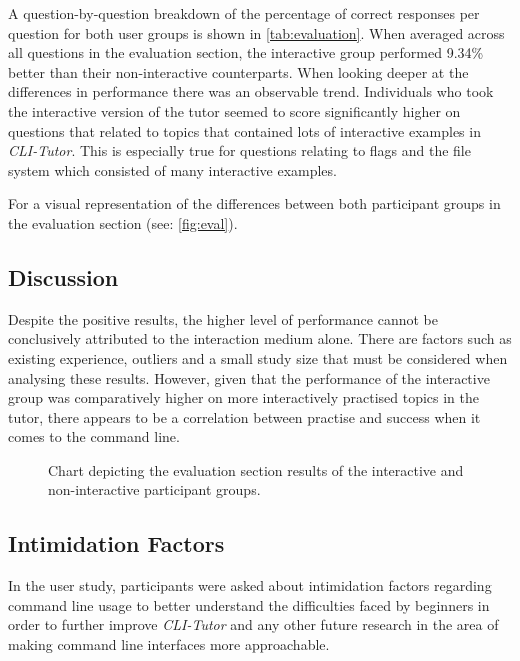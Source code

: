 A question-by-question breakdown of the percentage of correct responses per
question for both user groups is shown in \autoref{tab:evaluation}. When
averaged across all questions in the evaluation section, the interactive group
performed 9.34\% better than their non-interactive counterparts. When looking
deeper at the differences in performance there was an observable trend.
Individuals who took the interactive version of the tutor seemed to score
significantly higher on questions that related to topics that contained lots of
interactive examples in \textit{CLI-Tutor}. This is especially true for
questions relating to flags and the file system which consisted of many
interactive examples.

For a visual representation of the differences between both participant groups
in the evaluation section (see: \autoref{fig:eval}).

\subsection{Discussion}

Despite the positive results, the higher level of performance cannot be
conclusively attributed to the interaction medium alone. There are factors such
as existing experience, outliers and a small study size that must be considered
when analysing these results. However, given that the performance of the
interactive group was comparatively higher on more interactively practised
topics in the tutor, there appears to be a correlation between practise and
success when it comes to the command line.



\begin{figure}[htbp]
	\centering
	\scalebox{0.67}{}
	\caption{Chart depicting the evaluation section results of the interactive and non-interactive participant groups.}
	\label{fig:eval}
\end{figure}

\FloatBarrier %

\subsection{Intimidation Factors}

In the user study, participants were asked about intimidation factors regarding
command line usage to better understand the difficulties faced by
beginners in order to further improve \textit{CLI-Tutor} and any other future
research in the area of making command line interfaces more approachable.


